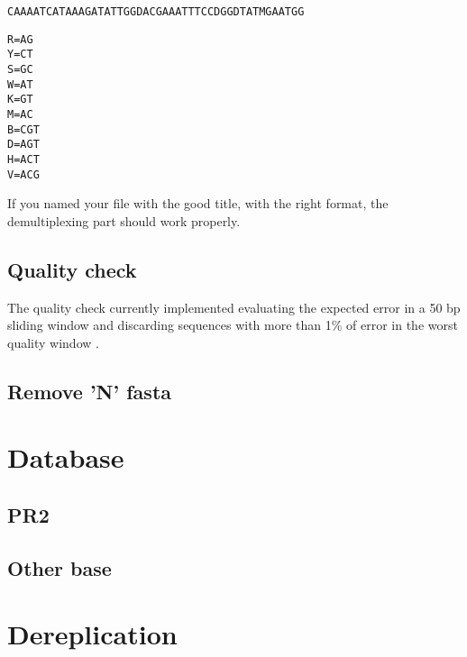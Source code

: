 \documentclass{article}\usepackage[]{graphicx}\usepackage[]{color}
\makeatletter
\newcommand{\hlstd}[1]{\textcolor[rgb]{0.345,0.345,0.345}{#1}}%
\newcommand{\hlkwb}[1]{\textcolor[rgb]{0.69,0.353,0.396}{#1}}%
\newenvironment{kframe}{%
 \def\at@end@of@kframe{}%
 \ifinner\ifhmode%
  \def\at@end@of@kframe{\end{minipage}}%
  \begin{minipage}{\columnwidth}%
 \fi\fi%
 \def\FrameCommand##1{\hskip\@totalleftmargin \hskip-\fboxsep
 \colorbox{shadecolor}{##1}\hskip-\fboxsep
     \hskip-\linewidth \hskip-\@totalleftmargin \hskip\columnwidth}%
 \MakeFramed {\advance\hsize-\width
   \@totalleftmargin\z@ \linewidth\hsize
   \@setminipage}}%
 {\par\unskip\endMakeFramed%
 \at@end@of@kframe}
\newenvironment{knitrout}{}{} %
\makeatother
\begin{document}
\begin{knitrout}
\color{fgcolor}\begin{kframe}
\begin{alltt}
CAAAATCATAAAGATATTGGDAC	GAAATTTCCDGGDTATMGAATGG
\end{alltt}
\end{kframe}
\end{knitrout}

\begin{knitrout}
\color{fgcolor}\begin{kframe}
\begin{alltt}
\hlstd{R} \hlkwb{=} \hlstd{AG}
\hlstd{Y} \hlkwb{=} \hlstd{CT}
\hlstd{S} \hlkwb{=} \hlstd{GC}
\hlstd{W} \hlkwb{=} \hlstd{AT}
\hlstd{K} \hlkwb{=} \hlstd{GT}
\hlstd{M} \hlkwb{=} \hlstd{AC}
\hlstd{B} \hlkwb{=} \hlstd{CGT}
\hlstd{D} \hlkwb{=} \hlstd{AGT}
\hlstd{H} \hlkwb{=} \hlstd{ACT}
\hlstd{V} \hlkwb{=} \hlstd{ACG}
\end{alltt}
\end{kframe}
\end{knitrout}

If you named your file with the good title, with the right format, the demultiplexing part should work properly.

\subsection{Quality check}
\label{subsec:qualcheck}

The quality check currently implemented evaluating the expected error in a 50 bp sliding window and discarding sequences with more than 1\% of error in the worst quality window \cite{DeVargas2015}.

\subsection{Remove 'N' fasta}


\section{Database}
\subsection{PR2}

\subsection{Other base}


\section{Dereplication}



\end{document}
